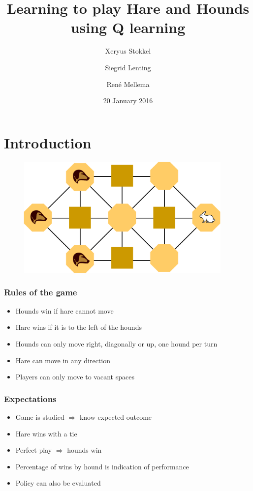 \documentclass{beamer}
\title{Learning to play Hare and Hounds using Q learning}
\author{Xeryus Stokkel \and Siegrid Lenting \and Ren\'e Mellema}
\date{20 January 2016}
\begin{document}
\begin{frame}
    \maketitle
\end{frame}

\section{Introduction}
\begin{frame}
	\begin{figure}
		\centering
		\includegraphics[width=300pt]{Hare_and_Hounds_board.png}
		\label{fig:Hare_and_Hounds_board}
	\end{figure}		
\end{frame}

\begin{frame}
    \frametitle{Rules of the game}
    \begin{itemize}
        \item Hounds win if hare cannot move
        \item Hare wins if it is to the left of the hounds
        \item Hounds can only move right, diagonally or up, one hound per turn
        \item Hare can move in any direction
        \item Players can only move to vacant spaces
    \end{itemize}
\end{frame}

\begin{frame}
    \frametitle{Expectations}
    \begin{itemize}[<+->]
        \item<1-> Game is studied \pause $\Rightarrow$ know expected outcome
        \item<3-> Hare wins with a tie
        \item<4-> Perfect play $\Rightarrow$ hounds win
        \item<5-> Percentage of wins by hound is indication of performance
        \item<6-> Policy can also be evaluated
    \end{itemize}
\end{frame}
\end{document}
